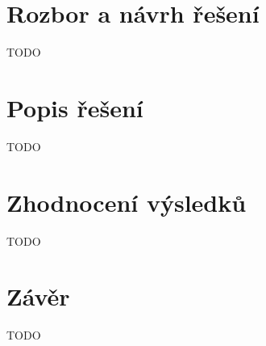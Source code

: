 \chapter{Rozbor a návrh řešení}
\label{rozbor}
TODO

\chapter{Popis řešení}
\label{popis}
TODO

\chapter{Zhodnocení výsledků} 
\label{zhodnoceni}
TODO

\chapter{Závěr}
\label{zaver}
TODO


%

